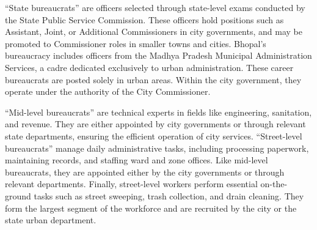 ``State bureaucrats'' are officers selected through state-level exams conducted by the State Public Service Commission. These officers hold positions such as Assistant, Joint, or Additional Commissioners in city governments, and may be promoted to Commissioner roles in smaller towns and cities. Bhopal's bureaucracy includes officers from the Madhya Pradesh Municipal Administration Services, a cadre dedicated exclusively to urban administration. These career bureaucrats are posted solely in urban areas. Within the city government, they operate under the authority of the City Commissioner.

``Mid-level bureaucrats'' are technical experts in fields like engineering, sanitation, and revenue. They are either appointed by city governments or through relevant state departments, ensuring the efficient operation of city services. ``Street-level bureaucrats'' manage daily administrative tasks, including processing paperwork, maintaining records, and staffing ward and zone offices. Like mid-level bureaucrats, they are appointed either by the city governments or through relevant departments. Finally, street-level workers perform essential on-the-ground tasks such as street sweeping, trash collection, and drain cleaning. They form the largest segment of the workforce and are recruited by the city or the state urban department.

